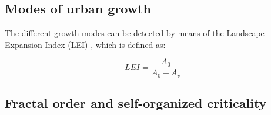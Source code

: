 \documentclass[10pt,letterpaper]{article}
\begin{document}
\subsection*{Modes of urban growth}

The different growth modes can be detected by means of the Landscape Expansion Index (LEI) \cite{liu2010new}, which is defined as:

\begin{equation}
  \label{eq:lei}
  LEI = \frac{A_0}{A_0 + A_v}
\end{equation}

\subsection*{Fractal order and self-organized criticality}



\end{document}

